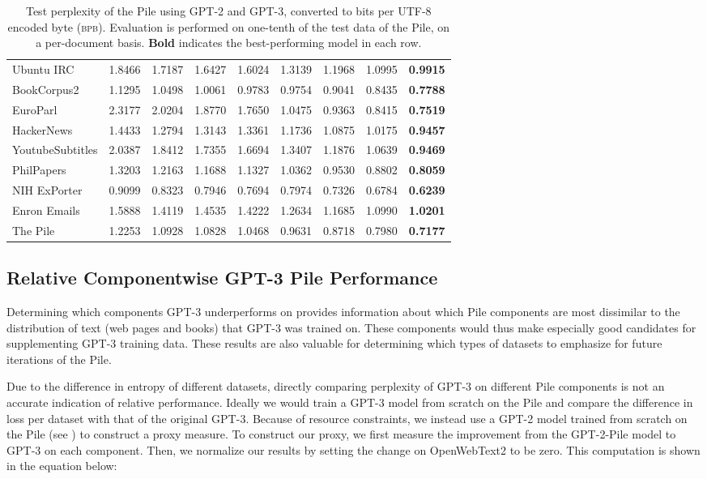 \documentclass[11pt,a4paper]{article}
\begin{document}
\begin{table}[ht]
{\begin{tabular}{l rrrr rrrr}
    Ubuntu IRC & 1.8466 & 1.7187 & 1.6427 & 1.6024 & 1.3139 & 1.1968 & 1.0995 & \textbf{0.9915} \\
    BookCorpus2 & 1.1295 & 1.0498 & 1.0061 & 0.9783 & 0.9754 & 0.9041 & 0.8435 & \textbf{0.7788} \\
    EuroParl & 2.3177 & 2.0204 & 1.8770 & 1.7650 & 1.0475 & 0.9363 & 0.8415 & \textbf{0.7519} \\
    HackerNews & 1.4433 & 1.2794 & 1.3143 & 1.3361 & 1.1736 & 1.0875 & 1.0175 & \textbf{0.9457} \\
    YoutubeSubtitles & 2.0387 & 1.8412 & 1.7355 & 1.6694 & 1.3407 & 1.1876 & 1.0639 & \textbf{0.9469} \\
    PhilPapers & 1.3203 & 1.2163 & 1.1688 & 1.1327 & 1.0362 & 0.9530 & 0.8802 & \textbf{0.8059} \\
    NIH ExPorter & 0.9099 & 0.8323 & 0.7946 & 0.7694 & 0.7974 & 0.7326 & 0.6784 & \textbf{0.6239} \\
    Enron Emails & 1.5888 & 1.4119 & 1.4535 & 1.4222 & 1.2634 & 1.1685 & 1.0990 & \textbf{1.0201} \\
    \midrule
    The Pile & 1.2253 & 1.0928 & 1.0828 & 1.0468 & 0.9631 & 0.8718 & 0.7980 & \textbf{0.7177} \\
        \bottomrule
    \end{tabular}
}
\caption{Test perplexity of the Pile using GPT-2 and GPT-3, converted to bits per UTF-8 encoded byte (\textsc{bpb}). Evaluation is performed on one-tenth of the test data of the Pile, on a per-document basis. \textbf{Bold} indicates the best-performing model in each row.}
\label{table:pile_perplexity_utf8}
\end{table}

\subsection{Relative Componentwise GPT-3 Pile Performance}\label{sec:entropy_adjusted}

Determining which components GPT-3 underperforms on provides information about which Pile components are most dissimilar to the distribution of text (web pages and books) that GPT-3 was trained on. These components would thus make especially good candidates for supplementing GPT-3 training data. These results are also valuable for determining which types of datasets to emphasize for future iterations of the Pile.

Due to the difference in entropy of different datasets, directly comparing perplexity of GPT-3 on different Pile components is not an accurate indication of relative performance. Ideally we would train a GPT-3 model from scratch on the Pile and compare the difference in loss per dataset with that of the original GPT-3. Because of resource constraints, we instead use a GPT-2 model trained from scratch on the Pile (see ) to construct a proxy measure. To construct our proxy, we first measure the improvement from the GPT-2-Pile model to GPT-3 on each component. Then, we normalize our results by setting the change on OpenWebText2 to be zero. This computation is shown in the equation below:
\end{document}
